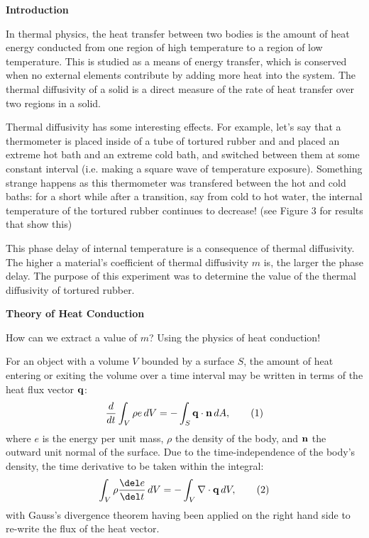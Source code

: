 \documentclass[11pt]{article}
\begin{document}
\begin{multicols}{2}


     \selectfont \textbf{Introduction}
    
     \selectfont 
    
    In thermal physics, the heat transfer between two bodies is the amount of heat energy conducted from one region of high temperature to a region of low temperature. This is studied as a means of energy transfer, which is conserved when no external elements contribute by adding more heat into the system. The thermal diffusivity of a solid is a direct measure of the rate of heat transfer over two regions in a solid.

    Thermal diffusivity has some interesting effects. For example, let's say that a thermometer is placed inside of a tube of tortured rubber and and placed an extreme hot bath and an extreme cold bath, and switched between them at some constant interval (i.e. making a square wave of temperature exposure). Something strange happens as this thermometer was transfered between the hot and cold baths: for a short while after a transition, say from cold to hot water, the internal temperature of the tortured rubber continues to decrease! (see Figure 3 for results that show this)
    
    This phase delay of internal temperature is a consequence of thermal diffusivity. The higher a material's coefficient of thermal diffusivity $m$ is, the larger the phase delay. The purpose of this experiment was to determine the value of the thermal diffusivity of tortured rubber. 


    \vspace{10pt}

     \selectfont \textbf{Theory of Heat Conduction}
    
     \selectfont 

    How can we extract a value of $m$? Using the physics of heat conduction!
     

    For an object with a volume $V$ bounded by a surface $S$, the amount of heat entering or exiting the volume over a time interval may be written in terms of the heat flux vector ${\bf{q}}$:
    \[
        \frac{d}{dt}\int_V \rho e\, dV = -\int_S {\bf{q}}\cdot {\bf{n}}\, dA,  \tag{1} 
    \]
    \nd where $e$ is the energy per unit mass, $\rho$ the density of the body, and ${\bf{n}}$ the outward unit normal of the surface. Due to the time-independence of the body's density, the time derivative to be taken within the integral: 
    \[
        \int_V \rho \frac{\del e}{\del t}\, dV = -\int_V\nabla\cdot {\bf{q}}\, dV,  \tag{2}
    \]
    \nd with Gauss's divergence theorem having been applied on the right hand side to re-write the flux of the heat vector.


\end{multicols}
\end{document}
